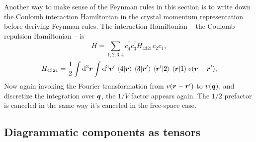 \documentclass[hyperref, a4paper, 12pt]{report}
\begin{document}
Another way to make sense of the Feynman rules in this section is 
to write down the Coulomb interaction Hamiltonian in the 
crystal momentum representation
before deriving Feynman rules.
The interaction Hamiltonian -- the Coulomb repulsion Hamiltonian -- is 
\begin{equation}
    H = \sum_{1, 2, 3, 4} c^\dagger_4 c^\dagger_3 H_{4321} c_2 c_1,
\end{equation}
\begin{equation}
    H_{4321} = \frac{1}{2} \int \dd[3]{\vb*{r}} \int \dd[3]{\vb*{r}'}
    \braket*{4}{\vb*{r}} \braket*{3}{\vb*{r}'} \braket*{\vb*{r}'}{2} \braket*{\vb*{r}}{1}
    v(\vb*{r} - \vb*{r}'),
\end{equation}
Now again invoking the Fourier transformation from $v(\vb*{r} - \vb*{r}')$ to $v(\vb*{q})$,
and discretize the integration over $\vb*{q}$,
the $1/V$ factor appears again.
The $1/2$ prefactor is canceled in the same way it's canceled in the free-space case.

\subsection{Diagrammatic components as tensors}\label{sec:crystal-tensor}
\end{document}
